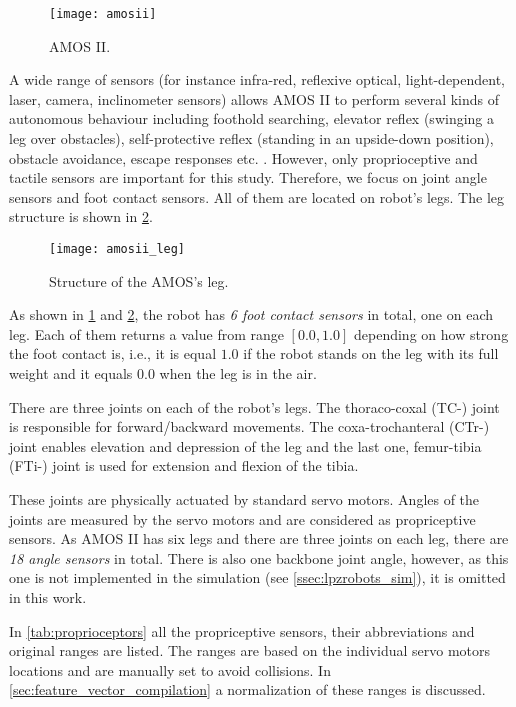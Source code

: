 \begin{figure}[H]
  \centering
  \texttt{[image: amosii]}
  \caption{AMOS II. \citep{misc:amosii}}
  \label{img:amosii}
\end{figure}

A wide range of sensors (for instance infra-red, reflexive optical, light-dependent, laser, camera, inclinometer sensors) allows AMOS II to perform several kinds of autonomous behaviour including foothold searching, elevator reflex (swinging a leg over obstacles), self-protective reflex (standing in an upside-down position), obstacle avoidance, escape responses etc. \citep{misc:amosii}. However, only proprioceptive and tactile sensors are important for this study. Therefore, we focus on joint angle sensors and foot contact sensors. All of them are located on robot's legs. The leg structure is shown in \cref{img:amosii_leg}.

\begin{figure}[H]
  \centering
  \texttt{[image: amosii\_leg]}
  \caption{Structure of the AMOS's leg. \citep{misc:amosii}}
  \label{img:amosii_leg}
\end{figure}

As shown in \cref{img:amosii} and \cref{img:amosii_leg}, the robot has \textit{6 foot contact sensors} in total, one on each leg. Each of them returns a value from range $ [0.0, 1.0] $ depending on how strong the foot contact is, i.e., it is equal $ 1.0 $ if the robot stands on the leg with its full weight and it equals $ 0.0 $ when the leg is in the air.

There are three joints on each of the robot's legs. The thoraco-coxal (TC-) joint is responsible for forward/backward movements. The coxa-trochanteral (CTr-) joint enables elevation and depression of the leg and the last one, femur-tibia (FTi-) joint is used for extension and flexion of the tibia.

These joints are physically actuated by standard servo motors. Angles of the joints are measured by the servo motors and are considered as propriceptive sensors. As AMOS II has six legs and there are three joints on each leg, there are \textit{18 angle sensors} in total. There is also one backbone joint angle, however, as this one is not implemented in the simulation (see \cref{ssec:lpzrobots_sim}), it is omitted in this work.

In \cref{tab:proprioceptors} all the propriceptive sensors, their abbreviations and original ranges are listed. The ranges are based on the individual servo motors locations and are manually set to avoid collisions. In \cref{sec:feature_vector_compilation} a normalization of these ranges is discussed.

